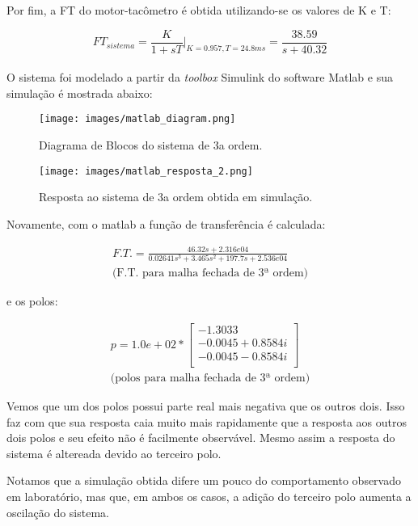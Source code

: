Por fim, a FT do motor-tacômetro é obtida utilizando-se os valores de K e T:

\begin{equation}
FT_{sistema}=\frac{K}{1+sT}|_{K=0.957, T=24.8ms}=\frac{38.59}{s+40.32}
\end{equation}


\paragraph{}
O sistema foi modelado a partir da \emph{toolbox} Simulink do software Matlab e sua simulação é mostrada abaixo:


\begin{figure*}[ht]
\centering
\texttt{[image: images/matlab\_diagram.png]}
\caption{Diagrama de Blocos do sistema de 3a ordem.}
\label{fig:blockdiagram-3a-ordem}
\end{figure*}


\begin{figure}[H]
\centering
\texttt{[image: images/matlab\_resposta\_2.png]}
\caption{Resposta ao sistema de 3a ordem obtida em simulação.}
\label{fig:3a-ordem-resposta-simulada}
\end{figure}

Novamente, com o matlab a função de transferência é calculada:

\begin{equation}
\begin{array}{l}
    \boxed{F.T.
    = \frac{46.32 s + 2.316e04}{  0.02641 s^3 + 3.465 s^2 + 197.7 s + 2.536e04}} \\
    \mbox{(F.T. para malha fechada de 3ª ordem)}
\end{array}
\end{equation}


e os polos:

\begin{equation}
\begin{array}{l}
    \boxed{p =    1.0e+02 * 
    \left[ \begin{array}{l}
  -1.3033          \\
  -0.0045 + 0.8584i \\
  -0.0045 - 0.8584i \\
    \end{array} \right]
} \\
    \mbox{(polos para malha fechada de 3ª ordem)}
\end{array}
\end{equation}

Vemos que um dos polos possui parte real  mais negativa que os outros dois. Isso faz com que sua resposta caia muito mais rapidamente que a resposta aos outros dois polos e seu efeito não é facilmente observável. Mesmo assim a resposta do sistema é altereada devido ao terceiro polo.

Notamos que a simulação obtida difere um pouco do comportamento observado em laboratório, mas que, em ambos os casos, a adição do terceiro polo aumenta a oscilação do sistema.

